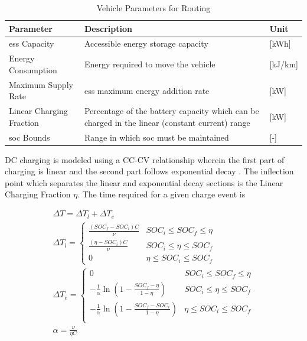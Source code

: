 \begin{table}[H]
	\centering
	\caption{Vehicle Parameters for Routing}
	\label{tab:param_veh}
	\begin{tabular}{|C{/8}|C{/8}|C{/8}|}
		\hline {} Parameter & Description & Unit \\
		\hline \gls{ess} Capacity & Accessible energy storage capacity & [kWh] \\
		\hline Energy Consumption & Energy required to move the vehicle & [kJ/km] \\
		\hline Maximum Supply Rate & \gls{ess} maximum energy addition rate & [kW] \\
		\hline Linear Charging Fraction & Percentage of the battery capacity which can be charged in the linear (constant current) range & [kW] \\
		\hline \gls{soc} Bounds & Range in which \gls{soc} must be maintained & [-] \\
		\hline
	\end{tabular}
\end{table}

DC charging is modeled using a CC-CV relationship wherein the first part of charging is linear and the second part follows exponential decay \cite{Marra_2012}. The inflection point which separates the linear and exponential decay sections is the Linear Charging Fraction $\eta$. The time required for a given charge event is

\begin{gather}
	\Delta T = \Delta T_{l} + \Delta T_{e} \\
	\Delta T_{l} = \begin{cases}
		\frac{(SOC_f - SOC_i) C}{\nu} &  SOC_i \leq SOC_f \leq \eta \\
		\frac{(\eta - SOC_i) C}{\nu} &  SOC_i \leq \eta \leq SOC_f \\
		0 &  \eta \leq SOC_i \leq SOC_f
	\end{cases} \\
	\Delta T_{e} = \begin{cases}
		0 & SOC_i \leq SOC_f \leq \eta \\
		-\frac{1}{\alpha}\ln{\left(1-\frac{SOC_f - \eta}{1-\eta}\right)} &  SOC_i \leq \eta \leq SOC_f \\
		-\frac{1}{\alpha}\ln{\left(1-\frac{SOC_f - SOC_i}{1-\eta}\right)} &  \eta \leq SOC_i \leq SOC_f \\
	\end{cases} \\
	\alpha = \frac{\nu}{\eta C}
\end{gather}

